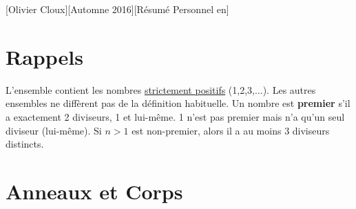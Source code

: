 \documentclass[12pt,a4paper]{article}
\begin{document}
[Olivier Cloux][Automne 2016][Résumé Personnel en]
\newpage
\tableofcontents
{}
\section{Rappels}
L'ensemble \N contient les nombres \uline{strictement positifs} (1,2,3,...). Les autres ensembles ne diffèrent pas de la définition habituelle. Un nombre est \textbf{premier} s'il a exactement 2 diviseurs, 1 et lui-même. 1 n'est pas premier mais n'a qu'un seul diviseur (lui-même). Si $n>1$ est non-premier, alors il a au moins 3 diviseurs distincts. 

\section{Anneaux et Corps}
\end{document}
